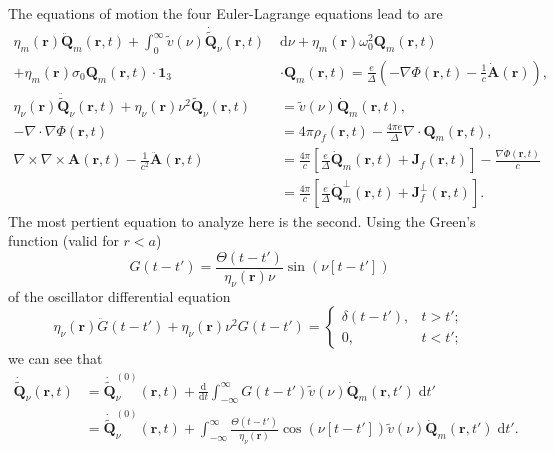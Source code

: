 \documentclass{article}
\begin{document}
The equations of motion the four Euler-Lagrange equations lead to are
\begin{equation}\label{eq:fourEOMs}
\begin{split}
\eta_m(\mathbf{r})\ddot{\mathbf{Q}}_m(\mathbf{r},t) + \int_0^\infty\tilde{v}(\nu)\dot{\tilde{\mathbf{Q}}}_\nu(\mathbf{r},t)\;&\mathrm{d}\nu + \eta_m(\mathbf{r})\omega_0^2\mathbf{Q}_m(\mathbf{r},t)\\
+ \eta_m(\mathbf{r})\sigma_0\mathbf{Q}_m(\mathbf{r},t)\cdot\bm{1}_3&\cdot\mathbf{Q}_m(\mathbf{r},t) = \frac{e}{\Delta}\left(-\nabla\Phi(\mathbf{r},t) - \frac{1}{c}\dot{\mathbf{A}}(\mathbf{r})\right),\\[1.0em]
\eta_\nu(\mathbf{r})\ddot{\tilde{\mathbf{Q}}}_\nu(\mathbf{r},t) + \eta_\nu(\mathbf{r})\nu^2\tilde{\mathbf{Q}}_\nu(\mathbf{r},t) &= \tilde{v}(\nu)\dot{\mathbf{Q}}_m(\mathbf{r},t),\\[0.5em]
-\nabla\cdot\nabla\Phi(\mathbf{r},t) &= 4\pi\rho_f(\mathbf{r},t) - \frac{4\pi e}{\Delta}\nabla\cdot\mathbf{Q}_m(\mathbf{r},t),\\
\nabla\times\nabla\times\mathbf{A}(\mathbf{r},t) - \frac{1}{c^2}\ddot{\mathbf{A}}(\mathbf{r},t) &= \frac{4\pi}{c}\left[\frac{e}{\Delta}\dot{\mathbf{Q}}_m(\mathbf{r},t) + \mathbf{J}_f(\mathbf{r},t)\right] - \frac{\nabla\dot{\Phi}(\mathbf{r},t)}{c}\\
&= \frac{4\pi}{c}\left[\frac{e}{\Delta}\dot{\mathbf{Q}}_m^\perp(\mathbf{r},t) + \mathbf{J}_f^\perp(\mathbf{r},t)\right].
\end{split}
\end{equation}
The most pertient equation to analyze here is the second. Using the Green's function (valid for $r < a$)
\begin{equation}
G(t - t') = \frac{\Theta(t - t')}{\eta_\nu(\mathbf{r})\nu}\sin(\nu[t - t'])
\end{equation}
of the oscillator differential equation
\begin{equation}
\eta_\nu(\mathbf{r})\ddot{G}(t - t') + \eta_\nu(\mathbf{r})\nu^2G(t - t') = 
\begin{cases}
\delta(t - t'), & t > t';\\
0, & t < t';
\end{cases}
\end{equation}
we can see that
\begin{equation}
\begin{split}
\dot{\tilde{\mathbf{Q}}}_\nu(\mathbf{r},t) &= \dot{\tilde{\mathbf{Q}}}_\nu^{(0)}(\mathbf{r},t) + \frac{\mathrm{d}}{\mathrm{d}t}\int_{-\infty}^\infty G(t - t')\tilde{v}(\nu)\dot{\mathbf{Q}}_m(\mathbf{r},t')\;\mathrm{d}t'\\
&= \dot{\tilde{\mathbf{Q}}}_\nu^{(0)}(\mathbf{r},t) + \int_{-\infty}^\infty\frac{\Theta(t - t')}{\eta_\nu(\mathbf{r})}\cos(\nu[t - t'])\tilde{v}(\nu)\dot{\mathbf{Q}}_m(\mathbf{r},t')\;\mathrm{d}t'.
\end{split}
\end{equation}
\end{document}
